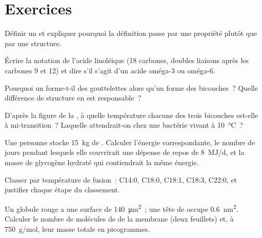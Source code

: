 \section{Exercices}

\begin{exercise}[$\star$]\label{exo:b1:lipids:1}
Définir un  et expliquer pourquoi la définition passe par une
propriété plutôt que par une structure.
\end{exercise}

\begin{exercise}[$\star$]\label{exo:b1:lipids:2}
Écrire la notation de l'acide linoléique (18 carbones, doubles liaisons
après les carbones 9 et 12) et dire s'il s'agit d'un acide oméga-3 ou
oméga-6.
\end{exercise}

\begin{exercise}[$\star$]\label{exo:b1:lipids:3}
Pourquoi un  forme-t-il des gouttelettes alors qu'un
 forme des bicouches~? Quelle différence de structure en
est responsable~?
\end{exercise}

\begin{exercise}[$\star$]\label{exo:b1:lipids:4}
D'après la figure de la , à quelle température chacune des trois
bicouches est-elle à mi-transition~? Laquelle attendrait-on chez une
bactérie vivant à \qty{10}{\celsius}~?
\end{exercise}

\begin{exercise}[$\star\star$]\label{exo:b1:lipids:5}
Une personne stocke \qty{15}{kg} de . Calculer l'énergie
correspondante, le nombre de jours pendant lesquels elle couvrirait une
dépense de repos de \qty{8}{MJ/d}, et la masse de glycogène hydraté qui
contiendrait la même énergie.
\end{exercise}

\begin{exercise}[$\star\star$]\label{exo:b1:lipids:6}
Classer par température de fusion~: C14:0, C18:0, C18:1, C18:3, C22:0,
et justifier chaque étape du classement.
\end{exercise}

\begin{exercise}[$\star\star$]\label{exo:b1:lipids:7}
Un globule rouge a une surface de \qty{140}{\micro m^2}~; une tête de
 occupe \qty{0.6}{nm^2}. Calculer le nombre de molécules de
 de la membrane (deux feuillets) et, à \qty{750}{g/mol},
leur masse totale en picogrammes.
\end{exercise}

